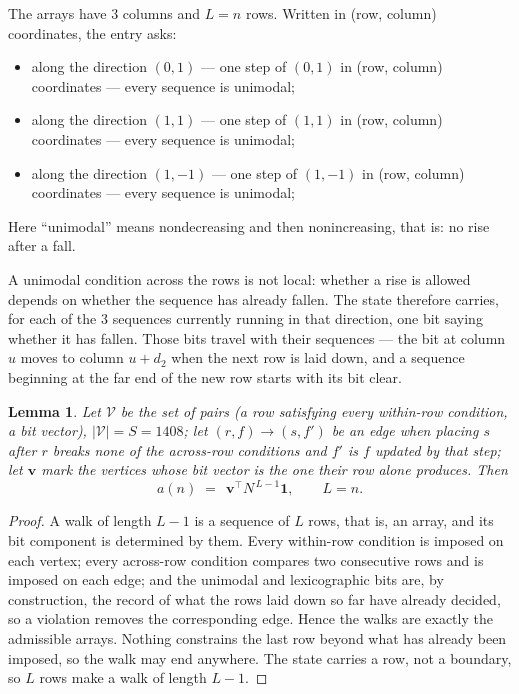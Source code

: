 \documentclass[11pt,a4paper]{article}
\theoremstyle{plain}
\newtheorem{lemma}[theorem]{Lemma}
\theoremstyle{definition}
\begin{document}
The arrays have $3$ columns and $L=n$ rows. Written in (row, column)
coordinates, the entry asks:
\begin{itemize}
\item along the direction $(0,1)$ --- one step of $(0,1)$ in (row, column) coordinates --- every sequence is unimodal;
\item along the direction $(1,1)$ --- one step of $(1,1)$ in (row, column) coordinates --- every sequence is unimodal;
\item along the direction $(1,-1)$ --- one step of $(1,-1)$ in (row, column) coordinates --- every sequence is unimodal;
\end{itemize}
Here ``unimodal'' means nondecreasing and then nonincreasing, that is: no rise after a fall.

A unimodal condition across the rows is not local: whether a
rise is allowed depends on whether the sequence has already fallen. The state therefore
carries, for each of the $3$ sequences currently running in that direction, one bit saying
whether it has fallen. Those bits travel with their sequences --- the bit at column $u$
moves to column $u+d_2$ when the next row is laid down, and a sequence beginning at the
far end of the new row starts with its bit clear.

\begin{lemma}\label{lem:walk}
Let $\mathcal V$ be the set of pairs (a row satisfying every within-row condition, a
bit vector), $|\mathcal V|=S=1408$; let $(r,f)\to(s,f')$ be an edge when placing $s$ after $r$
breaks none of the across-row conditions and $f'$ is $f$ updated by that step; let
$\mathbf{v}$ mark the vertices whose bit vector is the one their row alone produces.
Then
\[
a(n)\;=\;\,\mathbf{v}^{\!\top}N^{\,L-1}\mathbf{1},\qquad L=n.
\]
\end{lemma}

\begin{proof}
A walk of length $L-1$ is a sequence of $L$ rows, that is, an array, and its bit component
is determined by them. Every within-row condition is imposed on each vertex; every
across-row condition compares two consecutive rows and is imposed on each edge; and the
unimodal and lexicographic bits are, by construction, the record of what the rows laid down
so far have already decided, so a violation removes the corresponding edge. Hence the walks
are exactly the admissible arrays. Nothing constrains the last row beyond what has already
been imposed, so the walk may end anywhere. The state carries a row, not a boundary, so
$L$ rows make a walk of length $L-1$.
\end{proof}
\end{document}
